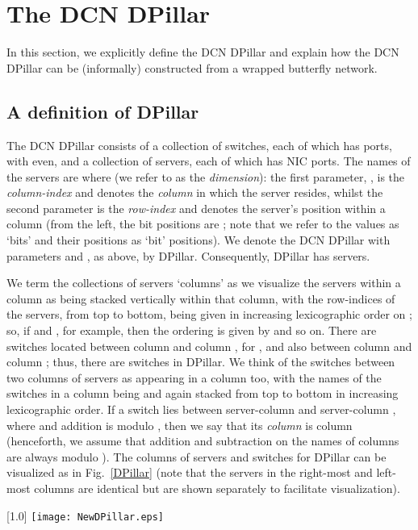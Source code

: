 \documentclass{article}
\newcounter{fig}
\begin{document}
\section{The DCN DPillar}\label{sec:def}

In this section, we explicitly define the DCN DPillar and explain how the DCN DPillar can be (informally) constructed from a wrapped butterfly network.

\subsection{A definition of DPillar}

The DCN DPillar \cite{LYY12} consists of a collection of switches, each of which has  ports, with  even, and a collection of servers, each of which has  NIC ports. The names of the servers are  where  (we refer to  as the \emph{dimension\/}): the first parameter, , is the \emph{column-index\/} and denotes the \emph{column\/} in which the server resides, whilst the second parameter  is the \emph{row-index\/} and denotes the server's position within a column (from the left, the bit positions are ; note that we refer to the values as `bits' and their positions as `bit' positions). We denote the DCN DPillar with parameters  and , as above, by DPillar. Consequently, DPillar has  servers. 

We term the collections of servers `columns' as we visualize the servers within a column as being stacked vertically within that column, with the row-indices of the servers, from top to bottom, being given in increasing lexicographic order on ; so, if  and , for example, then the ordering is given by  and so on. There are  switches located between column  and column , for , and also between column  and column ; thus, there are  switches in DPillar. We think of the switches between two columns of servers as appearing in a column too, with the names of the switches in a column being  and again stacked from top to bottom in increasing lexicographic order. If a switch lies between server-column  and server-column , where  and addition is modulo , then we say that its \emph{column\/} is column  (henceforth, we assume that addition and subtraction on the names of columns are always modulo ). The columns of servers and switches for DPillar can be visualized as in Fig.~\ref{DPillar} (note that the servers in the right-most and left-most columns are identical but are shown separately to facilitate visualization).

\begin{figure*}[t]
\centering
\scalebox{1.0}[1.0]{
\texttt{[image: NewDPillar.eps]}}
\caption{Visualizing DPillar.}\label{DPillar}
\end{figure*}
\end{document}
